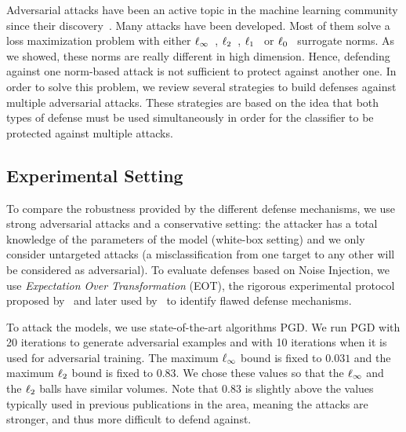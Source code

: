 Adversarial attacks have been an active topic in the machine learning community since their discovery~\cite{globerson2006nightmare, biggio2013evasion,szegedy2013intriguing}.
Many attacks have been developed.
Most of them solve a loss maximization problem with either $\ell_\infty $~\cite{goodfellow2014explaining,kurakin2016adversarial,madry2018towards}, $\ell_2 $~\cite{carlini2017towards,kurakin2016adversarial,madry2018towards}, $\ell_1 $~\cite{tramer2019adversarial} or $\ell_0 $~\cite{papernot2016limitations} surrogate norms.
As we showed, these norms are really different in high dimension.
Hence, defending against one norm-based attack is not sufficient to protect against another one. 
In order to solve this problem, we review several strategies to build defenses against multiple adversarial attacks.
These strategies are based on the idea that both types of defense must be used simultaneously in order for the classifier to be protected against multiple attacks.

\subsection{Experimental Setting}
\label{section:ap4-experimental_settings}

To compare the robustness provided by the different defense mechanisms, we use strong adversarial attacks and a conservative setting: the attacker has a total knowledge of the parameters of the model (white-box setting) and we only consider untargeted attacks  (a misclassification from one target to any other will be considered as adversarial).
To evaluate defenses based on Noise Injection, we use \emph{Expectation Over Transformation} (EOT), the rigorous experimental protocol  proposed by~\citet{athalye2017synthesizing} and later used by~\citet{athalye2018obfuscated,carlini2019evaluating} to identify flawed defense mechanisms. 

To attack the models, we use state-of-the-art algorithms PGD.
We run PGD with 20 iterations to generate adversarial examples and with 10 iterations when it is used for adversarial training.
The maximum $\ell_\infty $ bound is fixed to $0.031$ and the maximum $\ell_2 $ bound is fixed to $0.83$.
We chose these values so that the $\ell_\infty $ and the $\ell_2 $ balls have similar volumes.
Note that $0.83$ is slightly above the values typically used in previous publications in the area, meaning the attacks are stronger, and thus  more difficult to defend against.

